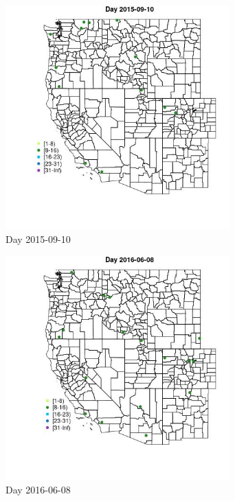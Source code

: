 \begin{figure} 
\centering  
\includegraphics[width=0.77\textwidth]{Code_Outputs/Report_ML_input_PM25_Step4_part_e_de_duplicated_aves_MapObsDay2015-09-10.jpg} 
\caption{\label{fig:Report_ML_input_PM25_Step4_part_e_de_duplicated_avesMapObsDay2015-09-10}Day 2015-09-10} 
\end{figure} 
 

\begin{figure} 
\centering  
\includegraphics[width=0.77\textwidth]{Code_Outputs/Report_ML_input_PM25_Step4_part_e_de_duplicated_aves_MapObsDay2016-06-08.jpg} 
\caption{\label{fig:Report_ML_input_PM25_Step4_part_e_de_duplicated_avesMapObsDay2016-06-08}Day 2016-06-08} 
\end{figure} 
 

